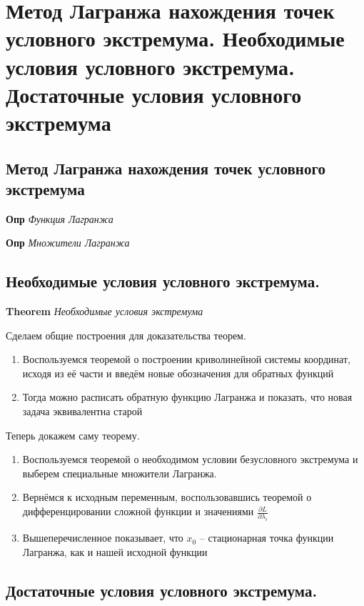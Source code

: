 \documentclass[a4paper, 14pt]{article}
\begin{document}
    \section{Метод Лагранжа нахождения точек условного экстремума.
    Необходимые условия условного экстремума.
    Достаточные условия условного экстремума}
    
    \subsection{Метод Лагранжа нахождения точек условного экстремума}
    
    \textbf{Опр} \textit{Функция Лагранжа}
    
    \textbf{Опр} \textit{Множители Лагранжа}
    
    \subsection{Необходимые условия условного экстремума.}
    
    \textbf{Theorem} \textit{Необходимые условия экстремума}
    
    Сделаем общие построения для доказательства теорем.
    
    \begin{enumerate}
        \item Воспользуемся теоремой о построении криволинейной системы координат, исходя из её части и введём новые
        обозначения для обратных функций
        \item Тогда можно расписать обратную функцию Лагранжа и показать, что новая задача эквивалентна старой
    \end{enumerate}
    
    Теперь докажем саму теорему.
    
    \begin{enumerate}
        \item Воспользуемся теоремой о необходимом условии безусловного экстремума и выберем специальные множители
        Лагранжа.
        \item Вернёмся к исходным переменным, воспользовавшись теоремой о дифференцировании сложной функции и значениями
        $\frac{\partial L}{\partial \lambda_i}$
        \item Вышеперечисленное показывает, что $x_0$ -- стационарная точка функции Лагранжа, как и нашей исходной функции
    \end{enumerate}
    
    \subsection{Достаточные условия условного экстремума.}
    
\end{document}
